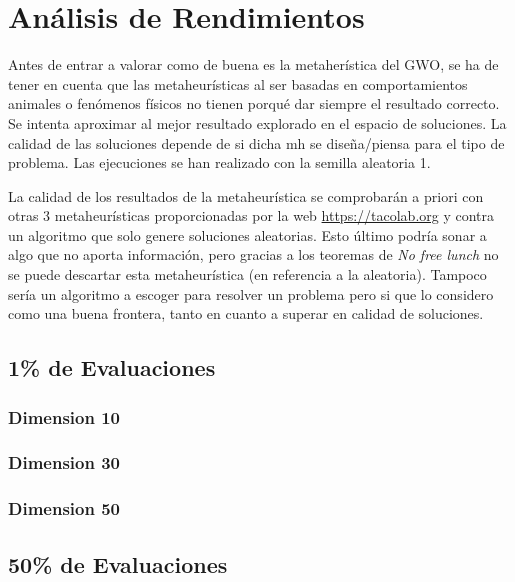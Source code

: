 \documentclass[a4paper, 12.5pt]{report}
\begin{document}
\section{Análisis de Rendimientos}

Antes de entrar a valorar como de buena es la metaherística del GWO, se ha de tener en cuenta que las metaheurísticas al ser basadas en comportamientos animales o fenómenos físicos no tienen porqué dar siempre el resultado correcto.
Se intenta aproximar al mejor resultado explorado en el espacio de soluciones.     La calidad de las soluciones depende de si dicha mh se diseña/piensa para el tipo de problema. Las ejecuciones se han realizado con la semilla aleatoria 1.

La calidad de los resultados de la metaheurística se comprobarán a priori con otras 3 metaheurísticas proporcionadas por la web \url{https://tacolab.org} y contra un algoritmo que solo genere soluciones aleatorias.     Esto último podría sonar a algo que no aporta información, pero gracias a los teoremas de \textit{No free lunch} no se puede descartar esta metaheurística (en referencia a la aleatoria). Tampoco sería un algoritmo a escoger para resolver un problema pero si que lo considero como una buena frontera, tanto en cuanto a superar en calidad de soluciones.



\subsection{1\% de Evaluaciones}

\subsubsection*{Dimension 10}

\subsubsection*{Dimension 30}

\subsubsection*{Dimension 50}



\subsection{50\% de Evaluaciones}
\end{document}
